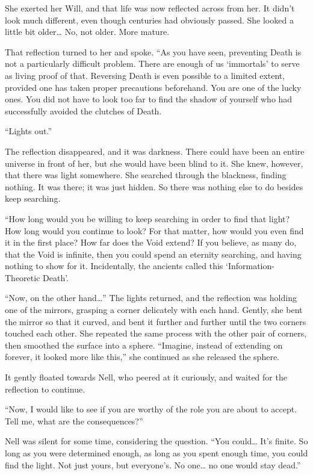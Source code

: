 She exerted her Will, and that life was now reflected across from her. It didn’t look much different, even though centuries had obviously passed. She looked a little bit older… No, not older. More mature.

That reflection turned to her and spoke. “As you have seen, preventing Death is not a particularly difficult problem. There are enough of us ‘immortals’ to serve as living proof of that. Reversing Death is even possible to a limited extent, provided one has taken proper precautions beforehand. You are one of the lucky ones. You did not have to look too far to find the shadow of yourself who had successfully avoided the clutches of Death.

“Lights out.”

The reflection disappeared, and it was darkness. There could have been an entire universe in front of her, but she would have been blind to it. She knew, however, that there was light somewhere. She searched through the blackness, finding nothing. It was there; it was just hidden. So there was nothing else to do besides keep searching.

“How long would you be willing to keep searching in order to find that light? How long would you continue to look? For that matter, how would you even find it in the first place? How far does the Void extend? If you believe, as many do, that the Void is infinite, then you could spend an eternity searching, and having nothing to show for it. Incidentally, the ancients called this ‘Information-Theoretic Death’.

“Now, on the other hand…” The lights returned, and the reflection was holding one of the mirrors, grasping a corner delicately with each hand. Gently, she bent the mirror so that it curved, and bent it further and further until the two corners touched each other. She repeated the same process with the other pair of corners, then smoothed the surface into a sphere. “Imagine, instead of extending on forever, it looked more like this,” she continued as she released the sphere.

It gently floated towards Nell, who peered at it curiously, and waited for the reflection to continue.

“Now, I would like to see if you are worthy of the role you are about to accept. Tell me, what are the consequences?”

Nell was silent for some time, considering the question. “You could… It’s finite. So long as you were determined enough, as long as you spent enough time, you could find the light. Not just yours, but everyone’s. No one… no one would stay dead.”

